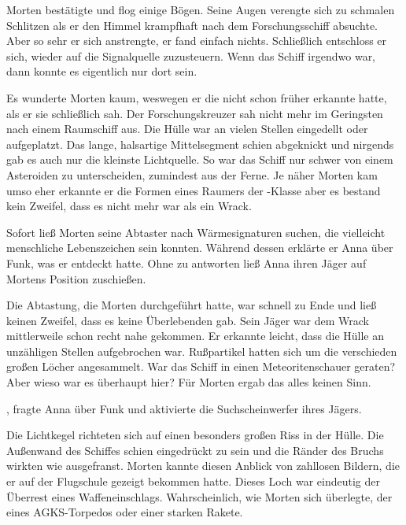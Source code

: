 Morten bestätigte und flog einige Bögen. Seine Augen verengte sich zu schmalen Schlitzen als er den Himmel krampfhaft nach dem Forschungsschiff absuchte. Aber so sehr er sich anstrengte, er fand einfach nichts. Schließlich entschloss er sich, wieder auf die Signalquelle zuzusteuern. Wenn das Schiff irgendwo war, dann konnte es eigentlich nur dort sein.

\par

Es wunderte Morten kaum, weswegen er die  nicht schon früher erkannte hatte, als er sie schließlich sah. Der Forschungskreuzer sah nicht mehr im Geringsten nach einem Raumschiff aus. Die Hülle war an vielen Stellen eingedellt oder aufgeplatzt. Das lange, halsartige Mittelsegment schien abgeknickt und nirgends gab es auch nur die kleinste Lichtquelle. So war das Schiff nur schwer von einem Asteroiden zu unterscheiden, zumindest aus der Ferne. Je näher Morten kam umso eher erkannte er die Formen eines Raumers der -Klasse aber es bestand kein Zweifel, dass es nicht mehr war als ein Wrack.

\par

Sofort ließ Morten seine Abtaster nach Wärmesignaturen suchen, die vielleicht menschliche Lebenszeichen sein konnten. Während dessen erklärte er Anna über Funk, was er entdeckt hatte. Ohne zu antworten ließ Anna ihren Jäger auf Mortens Position zuschießen.

\par

Die Abtastung, die Morten durchgeführt hatte, war schnell zu Ende und ließ keinen Zweifel, dass es keine Überlebenden gab. Sein Jäger war dem Wrack mittlerweile schon recht nahe gekommen. Er erkannte leicht, dass die Hülle an unzähligen Stellen aufgebrochen war. Rußpartikel hatten sich um die verschieden großen Löcher angesammelt. War das Schiff in einen Meteoritenschauer geraten? Aber wieso war es überhaupt hier? Für Morten ergab das alles keinen Sinn.

\par

, fragte Anna über Funk und aktivierte die Suchscheinwerfer ihres Jägers.

\par

Die Lichtkegel richteten sich auf einen besonders großen Riss in der Hülle. Die Außenwand des Schiffes schien eingedrückt zu sein und die Ränder des Bruchs wirkten wie ausgefranst. Morten kannte diesen Anblick von zahllosen Bildern, die er auf der Flugschule gezeigt bekommen hatte. Dieses Loch war eindeutig der Überrest eines Waffeneinschlags. Wahrscheinlich, wie Morten sich überlegte, der eines AGKS-Torpedos oder einer starken Rakete.

